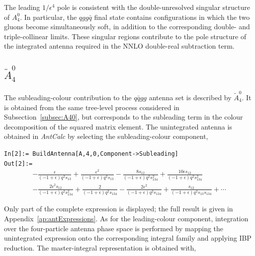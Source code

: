 The leading $1/\epsilon^4$ pole is consistent with the double-unresolved singular structure of
$A_4^0$. In particular, the $qgg\bar q$ final state contains configurations in which the two
gluons become simultaneously soft, in addition to the corresponding double- and triple-collinear
limits. These singular regions contribute to the pole structure of the integrated antenna
required in the NNLO double-real subtraction term.

\subsection{$\tilde A_4^0$}\label{subsec:A40t}


The subleading-colour contribution to the $q\bar qgg$ antenna set is described by
$\widetilde A_4^0$. It is obtained from the same tree-level process considered in
Subsection~\ref{subsec:A40}, but corresponds to the subleading term in the colour decomposition of
the squared matrix element. The unintegrated antenna is obtained in \textit{AntCalc} by
selecting the subleading-colour component,

\begin{mdframed}[backgroundcolor=gray!10, linewidth=0pt]
\texttt{In[2]:= BuildAntenna[A,4,0,Component->Subleading]}\\
\hfill
\texttt{Out[2]:=}
    \begin{equation*}
        \begin{gathered}
            -\frac{\epsilon}{(-1+\epsilon)q^2s_{13}}+\frac{\epsilon^2}{(-1+\epsilon)q^2s_{13}}-\frac{8s_{12}}{(-1+\epsilon)q^2s_{134}^2}+\frac{10\epsilon s_{12}}{(-1+\epsilon)q^2s_{134}^2}\\
            -\frac{2\epsilon^2s_{12}}{(-1+\epsilon)q^2s_{134}^2}+\frac{2}{(-1+\epsilon)q^2s_{134}}-\frac{2\epsilon^2}{(-1+\epsilon)q^2s_{134}}+\frac{s_{12}}{(-1+\epsilon)q^2s_{13}s_{134}}+\cdots
        \end{gathered}
    \end{equation*}
\end{mdframed}

Only part of the complete expression is displayed; the full result is given in
Appendix~\ref{ap:antExpressions}. As for the leading-colour component, integration over the
four-particle antenna phase space is performed by mapping the unintegrated expression onto the
corresponding integral family and applying IBP reduction. The master-integral representation is
obtained with,

